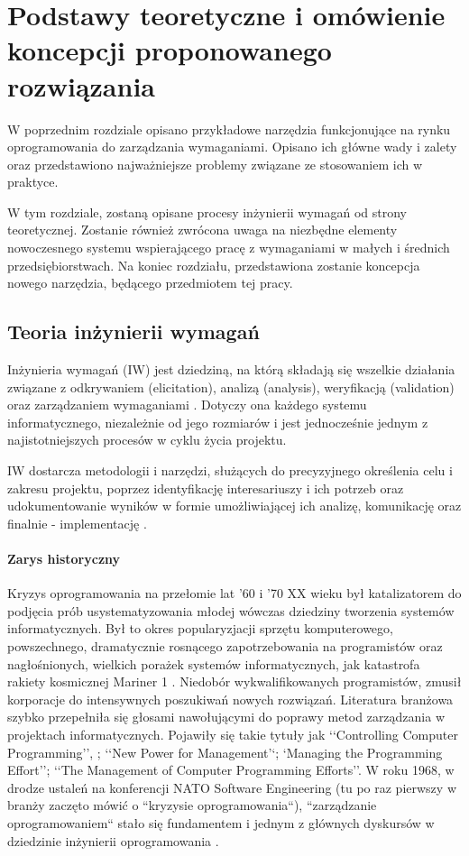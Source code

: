 \chapter{Podstawy teoretyczne i omówienie koncepcji proponowanego rozwiązania}
  
  W poprzednim rozdziale opisano przykładowe narzędzia funkcjonujące na rynku oprogramowania do zarządzania wymaganiami. Opisano ich główne wady i zalety oraz przedstawiono najważniejsze problemy związane ze stosowaniem ich w praktyce.

  W tym rozdziale, zostaną opisane procesy inżynierii wymagań od strony teoretycznej. Zostanie również zwrócona uwaga na niezbędne elementy nowoczesnego systemu wspierającego pracę z wymaganiami w małych i średnich przedsiębiorstwach. Na koniec rozdziału, przedstawiona zostanie koncepcja nowego narzędzia, będącego przedmiotem tej pracy.
  
  \section{Teoria inżynierii wymagań}
    
    Inżynieria wymagań (IW) jest dziedziną, na którą składają się wszelkie działania związane z odkrywaniem (elicitation), analizą (analysis), weryfikacją (validation) oraz zarządzaniem wymaganiami \cite{Somm06}. Dotyczy ona każdego systemu informatycznego, niezależnie od jego rozmiarów i jest jednocześnie jednym z najistotniejszych procesów w cyklu życia projektu.

    IW dostarcza metodologii i narzędzi, służących do precyzyjnego określenia celu i zakresu projektu, poprzez identyfikację interesariuszy i ich potrzeb oraz udokumentowanie wyników w formie umożliwiającej ich analizę, komunikację oraz finalnie - implementację \cite{Nus00}. 

      \subsubsection{Zarys historyczny}

        Kryzys oprogramowania na przełomie lat '60 i '70 XX wieku był katalizatorem do podjęcia prób usystematyzowania młodej wówczas dziedziny tworzenia systemów informatycznych. Był to okres popularyzjacji sprzętu komputerowego, powszechnego, dramatycznie rosnącego zapotrzebowania na programistów oraz nagłośnionych, wielkich porażek systemów informatycznych, jak katastrofa rakiety kosmicznej Mariner 1 \cite{Brooks75}. Niedobór wykwalifikowanych programistów, zmusił korporacje do intensywnych poszukiwań nowych rozwiązań. Literatura branżowa szybko przepełniła się głosami nawołującymi do poprawy metod zarządzania w projektach informatycznych. Pojawiły się takie tytuły jak ‘‘Controlling Computer Programming’’, ; ‘‘New Power for Management’‘; ‘Managing the Programming Effort’’; ‘‘The Management of Computer Programming Efforts’’. W roku 1968, w drodze ustaleń na konferencji NATO Software Engineering (tu po raz pierwszy w branży zaczęto mówić o ``kryzysie oprogramowania``), ``zarządzanie oprogramowaniem`` stało się fundamentem i jednym z głównych dyskursów w dziedzinie inżynierii oprogramowania \cite{Ense03}.
        
